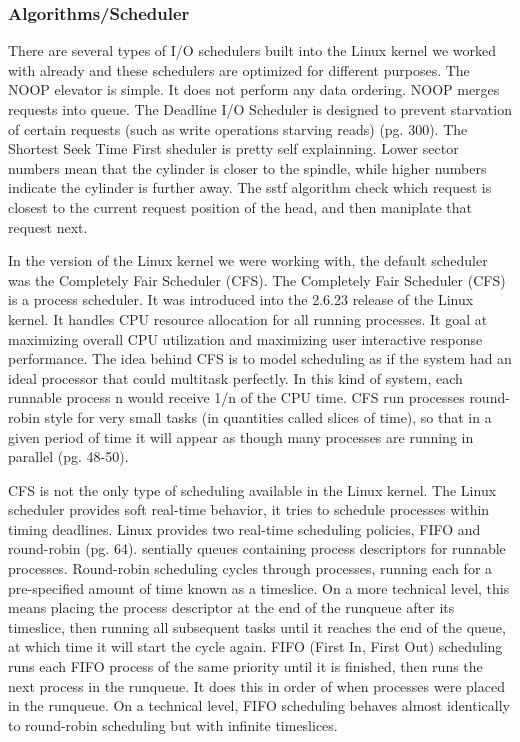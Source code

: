 \documentclass[10pt,draftclsnofoot,onecolumn,journal,compsoc]{IEEEtran}
\newcommand{\tab}{\hspace*{2em}} %
\begin{document}
\subsubsection*{Algorithms/Scheduler}

\tab There are several types of I/O schedulers built into the Linux kernel we worked with already and these schedulers are optimized for different purposes. The NOOP elevator is simple. It does not perform any data ordering. NOOP merges requests into queue. The Deadline I/O Scheduler is designed to prevent starvation of certain requests (such as write operations starving reads) \cite{Love}(pg. 300). The Shortest Seek Time First sheduler is pretty self explainning. Lower sector numbers mean that the cylinder is closer to the spindle, while higher numbers indicate the cylinder is further away. The sstf algorithm check which request is closest to the current request position of the head, and then maniplate that request next\cite{DSA}.

\tab In the version of the Linux kernel we were working with, the default scheduler was the Completely Fair Scheduler (CFS). The Completely Fair Scheduler (CFS) is a process scheduler. It was introduced into the 2.6.23 release of the Linux kernel. It handles CPU resource allocation for all running processes. It goal at maximizing overall CPU utilization and maximizing user interactive response performance. The idea behind CFS is to model scheduling as if the system had an ideal processor that could multitask perfectly. In this kind of system, each runnable process n would receive 1/n of the CPU time. CFS run processes round-robin style for very small tasks (in quantities called slices of time), so that in a given period of time it will appear as though many processes are running in parallel \cite{Love}(pg. 48-50).

\tab CFS is not the only type of scheduling available in the Linux kernel. The Linux scheduler provides soft real-time behavior, it tries to schedule processes within timing deadlines. Linux provides two real-time scheduling policies, FIFO and round-robin \cite{Love}(pg. 64). sentially queues containing process descriptors for runnable processes. Round-robin scheduling cycles through processes, running each for a pre-specified amount of time known as a timeslice. On a more technical level, this means placing the process descriptor at the end of the runqueue after its timeslice, then running all subsequent tasks until it reaches the end of the queue, at which time it will start the cycle again. FIFO (First In, First Out) scheduling runs each FIFO process of the same priority until it is finished, then runs the next process in the runqueue. It does this in order of when processes were placed in the runqueue. On a technical level, FIFO scheduling behaves almost identically to round-robin scheduling but with infinite timeslices.
\end{document}
